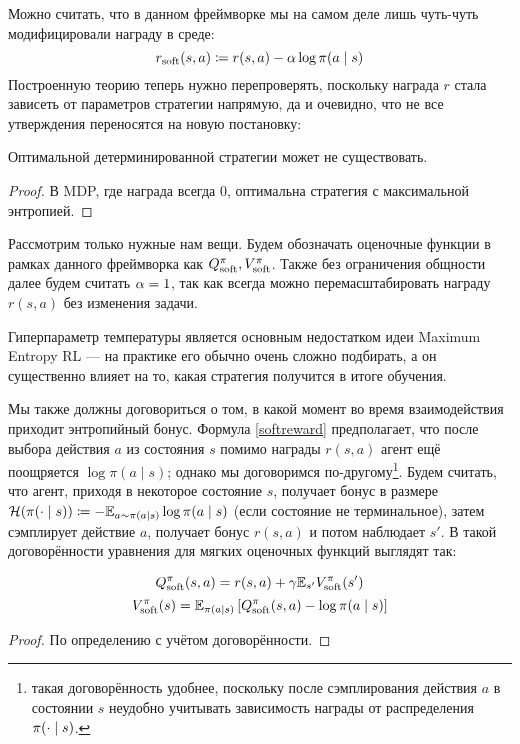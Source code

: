 Можно считать, что в данном фреймворке мы на самом деле лишь чуть-чуть модифицировали награду в среде:
\begin{equation}\label{softreward}
r_{\mathrm{soft}}(s, a) \coloneqq r(s, a) - \alpha \log \pi(a \mid s)
\end{equation}
Построенную теорию теперь нужно перепроверять, поскольку награда $r$ стала зависеть от параметров стратегии напрямую, да и очевидно, что не все утверждения переносятся на новую постановку:

\begin{proposition}
Оптимальной детерминированной стратегии может не существовать.
\begin{proof}
В MDP, где награда всегда 0, оптимальна стратегия с максимальной энтропией.
\end{proof}
\end{proposition}

Рассмотрим только нужные нам вещи. Будем обозначать оценочные функции в рамках данного фреймворка как $Q^\pi_{\mathrm{soft}}, V^\pi_{\mathrm{soft}}$. Также без ограничения общности далее будем считать $\alpha \HM= 1$, так как всегда можно перемасштабировать награду $r(s, a)$ без изменения задачи.

\begin{remark}
Гиперпараметр температуры является основным недостатком идеи Maximum Entropy RL --- на практике его обычно очень сложно подбирать, а он существенно влияет на то, какая стратегия получится в итоге обучения.
\end{remark}

Мы также должны договориться о том, в какой момент во время взаимодействия приходит энтропийный бонус. Формула \eqref{softreward} предполагает, что после выбора действия $a$ из состояния $s$ помимо награды $r(s, a)$ агент ещё поощряется $\log \pi(a \mid s)$; однако мы договоримся по-другому\footnote{такая договорённость удобнее, поскольку после сэмплирования действия $a$ в состоянии $s$ неудобно учитывать зависимость награды от распределения $\pi(\cdot \HM\mid s)$.}. Будем считать, что агент, приходя в некоторое состояние $s$, получает бонус в размере $\entropy(\pi(\cdot \mid s)) \HM\coloneqq - \E_{a \sim \pi(a \mid s)} \log \pi(a \mid s)$ (если состояние не терминальное), затем сэмплирует действие $a$, получает бонус $r(s, a)$ и потом наблюдает $s'$. В такой договорённости уравнения для мягких оценочных функций выглядят так:

\begin{theorem}
\begin{equation}\label{softQV}
Q^\pi_{\mathrm{soft}}(s, a) = r(s, a) + \gamma \mathbb{E}_{s'} V^\pi_{\mathrm{soft}}(s')
\end{equation}
\begin{equation}\label{softVQ}
V^\pi_{\mathrm{soft}}(s) = \mathbb{E}_{\pi(a \mid s)} \left[ Q^\pi_{\mathrm{soft}}(s, a) - \log \pi(a \mid s) \right]
\end{equation}
\begin{proof}
По определению с учётом договорённости.
\end{proof}
\end{theorem}

